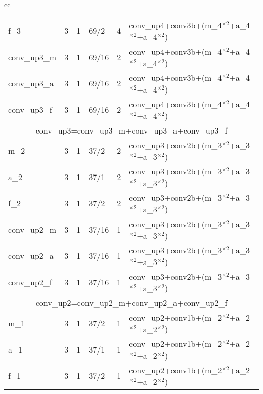 \begin{table*}[thb]
{\begin{tabular}{cc}
\begin{tabular}[t]{|*{6}{l|}}
            f\_3         & 3     & 1     & 69/2      & 4   & conv\_up4+conv3b+(m\_4$^{\times 2}$+a\_4$^{\times 2}$+a\_4$^{\times 2}$) \\
            conv\_up3\_m & 3     & 1     & 69/16     & 2   & conv\_up4+conv3b+(m\_4$^{\times 2}$+a\_4$^{\times 2}$+a\_4$^{\times 2}$) \\
            conv\_up3\_a & 3     & 1     & 69/16     & 2   & conv\_up4+conv3b+(m\_4$^{\times 2}$+a\_4$^{\times 2}$+a\_4$^{\times 2}$) \\
            conv\_up3\_f & 3     & 1     & 69/16     & 2   & conv\_up4+conv3b+(m\_4$^{\times 2}$+a\_4$^{\times 2}$+a\_4$^{\times 2}$) \\
            \hline
            \multicolumn{6}{|c|}{conv\_up3=conv\_up3\_m+conv\_up3\_a+conv\_up3\_f} \\
            \hline
            m\_2         & 3     & 1     & 37/2      & 2   & conv\_up3+conv2b+(m\_3$^{\times 2}$+a\_3$^{\times 2}$+a\_3$^{\times 2}$) \\
            a\_2         & 3     & 1     & 37/1      & 2   & conv\_up3+conv2b+(m\_3$^{\times 2}$+a\_3$^{\times 2}$+a\_3$^{\times 2}$) \\
            f\_2         & 3     & 1     & 37/2      & 2   & conv\_up3+conv2b+(m\_3$^{\times 2}$+a\_3$^{\times 2}$+a\_3$^{\times 2}$) \\
            conv\_up2\_m & 3     & 1     & 37/16     & 1   & conv\_up3+conv2b+(m\_3$^{\times 2}$+a\_3$^{\times 2}$+a\_3$^{\times 2}$) \\
            conv\_up2\_a & 3     & 1     & 37/16     & 1   & conv\_up3+conv2b+(m\_3$^{\times 2}$+a\_3$^{\times 2}$+a\_3$^{\times 2}$) \\
            conv\_up2\_f & 3     & 1     & 37/16     & 1   & conv\_up3+conv2b+(m\_3$^{\times 2}$+a\_3$^{\times 2}$+a\_3$^{\times 2}$) \\
            \hline
            \multicolumn{6}{|c|}{conv\_up2=conv\_up2\_m+conv\_up2\_a+conv\_up2\_f} \\
            \hline
            m\_1         & 3     & 1     & 37/2      & 1   & conv\_up2+conv1b+(m\_2$^{\times 2}$+a\_2$^{\times 2}$+a\_2$^{\times 2}$) \\
            a\_1         & 3     & 1     & 37/1      & 1   & conv\_up2+conv1b+(m\_2$^{\times 2}$+a\_2$^{\times 2}$+a\_2$^{\times 2}$) \\
            f\_1         & 3     & 1     & 37/2      & 1   & conv\_up2+conv1b+(m\_2$^{\times 2}$+a\_2$^{\times 2}$+a\_2$^{\times 2}$) \\
            \hline                                                                         
        \end{tabular}
    \end{tabular}
    }
\end{table*}
